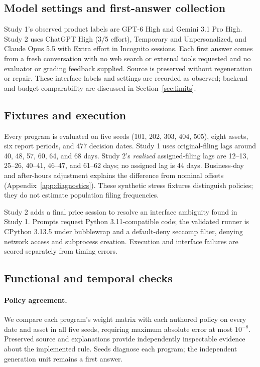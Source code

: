 \documentclass[10pt,twocolumn,a4paper]{article}
\begin{document}
\subsection{Model settings and first-answer collection}
Study 1's observed product labels are GPT-6 High and Gemini 3.1 Pro High. Study 2 uses ChatGPT High (3/5 effort), Temporary and Unpersonalized, and Claude Opus 5.5 with Extra effort in Incognito sessions. Each first answer comes from a fresh conversation with no web search or external tools requested and no evaluator or grading feedback supplied. Source is preserved without regeneration or repair. These interface labels and settings are recorded as observed; backend and budget comparability are discussed in Section~\ref{sec:limits}.

\subsection{Fixtures and execution}
\label{sec:fixtures}
Every program is evaluated on five seeds (101, 202, 303, 404, 505), eight assets, six report periods, and 477 decision dates. Study 1 uses original-filing lags around 40, 48, 57, 60, 64, and 68 days. Study 2's \emph{realized} assigned-filing lags are 12--13, 25--26, 40--41, 46--47, and 61--62 days; no assigned lag is 44 days. Business-day and after-hours adjustment explains the difference from nominal offsets (Appendix~\ref{app:diagnostics}). These synthetic stress fixtures distinguish policies; they do not estimate population filing frequencies.

Study 2 adds a final price session to resolve an interface ambiguity found in Study 1. Prompts request Python 3.11-compatible code; the validated runner is CPython 3.13.5 under bubblewrap and a default-deny seccomp filter, denying network access and subprocess creation. Execution and interface failures are scored separately from timing errors.

\subsection{Functional and temporal checks}
\paragraph{Policy agreement.}
We compare each program's weight matrix with each authored policy on every date and asset in all five seeds, requiring maximum absolute error at most $10^{-8}$. Preserved source and explanations provide independently inspectable evidence about the implemented rule. Seeds diagnose each program; the independent generation unit remains a first answer.
\end{document}
